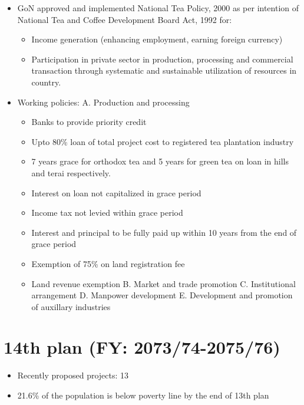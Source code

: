 \documentclass[
  openany]{book}
\providecommand{\tightlist}{%
  \setlength{\itemsep}{0pt}\setlength{\parskip}{0pt}}
\begin{document}
\begin{itemize}
\tightlist
\item
  GoN approved and implemented National Tea Policy, 2000 as per intention of National Tea and Coffee Development Board Act, 1992 for:

  \begin{itemize}
  \tightlist
  \item
    Income generation (enhancing employment, earning foreign currency)
  \item
    Participation in private sector in production, processing and commercial transaction through systematic and sustainable utilization of resources in country.
  \end{itemize}
\item
  Working policies:
  A. Production and processing

  \begin{itemize}
  \tightlist
  \item
    Banks to provide priority credit
  \item
    Upto 80\% loan of total project cost to registered tea plantation industry
  \item
    7 years grace for orthodox tea and 5 years for green tea on loan in hills and terai respectively.
  \item
    Interest on loan not capitalized in grace period
  \item
    Income tax not levied within grace period
  \item
    Interest and principal to be fully paid up within 10 years from the end of grace period
  \item
    Exemption of 75\% on land registration fee
  \item
    Land revenue exemption
    B. Market and trade promotion
    C. Institutional arrangement
    D. Manpower development
    E. Development and promotion of auxillary industries
  \end{itemize}
\end{itemize}

\hypertarget{th-plan-fy-207374-207576}{%
\section{14th plan (FY: 2073/74-2075/76)}\label{th-plan-fy-207374-207576}}

\begin{itemize}
\tightlist
\item
  Recently proposed projects: 13
\item
  21.6\% of the population is below poverty line by the end of 13th plan
\end{itemize}
\end{document}
